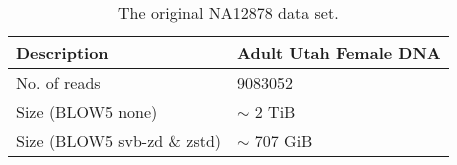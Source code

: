 \begin{table}
    \caption{\label{tab:data-orig}The original NA12878 data set.}
    \begin{tabular}{|l|l|}
        \hline
        Description & Adult Utah Female DNA\\
        \hline
	No. of reads & \num{9083052}\\
	Size (BLOW5 none) &$\sim$ 2 TiB\\
	Size (BLOW5 svb-zd \& zstd) &  $\sim$ 707 GiB\\
	\hline
    \end{tabular}
\end{table}
